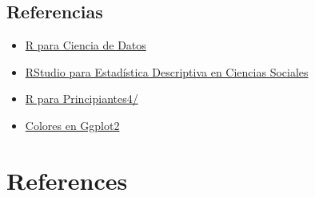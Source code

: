 \documentclass[
  letterpaper,
  DIV=11,
  numbers=noendperiod]{scrreprt}
\providecommand{\tightlist}{%
  \setlength{\itemsep}{0pt}\setlength{\parskip}{0pt}}\usepackage{longtable,booktabs,array}
\newlength{\cslhangindent}
\newlength{\cslentryspacingunit} %
\newenvironment{CSLReferences}[2] %
 {%
  \setlength{\parindent}{0pt}
  \ifodd #1
  \let\oldpar\par
  \def\par{\hangindent=\cslhangindent\oldpar}
  \fi
  \setlength{\parskip}{#2\cslentryspacingunit}
 }%
 {}
\begin{document}
\hypertarget{referencias-1}{%
\section{Referencias}\label{referencias-1}}

\begin{itemize}
\tightlist
\item
  \href{https://es.r4ds.hadley.nz}{R para Ciencia de Datos}
\item
  \href{https://bookdown.org/gboccardo/manual-ED-UCH/}{RStudio para
  Estadística Descriptiva en Ciencias Sociales}
\item
  \href{https://bookdown.org/jboscomendoza/r-principiantes4/}{R para
  Principiantes4/}
\item
  \href{https://ggplot2-book.org/scale-colour.html}{Colores en Ggplot2}
\end{itemize}


\hypertarget{references}{%
\chapter*{References}\label{references}}

\hypertarget{refs}{}
\begin{CSLReferences}{0}{0}
\end{CSLReferences}
\end{document}

